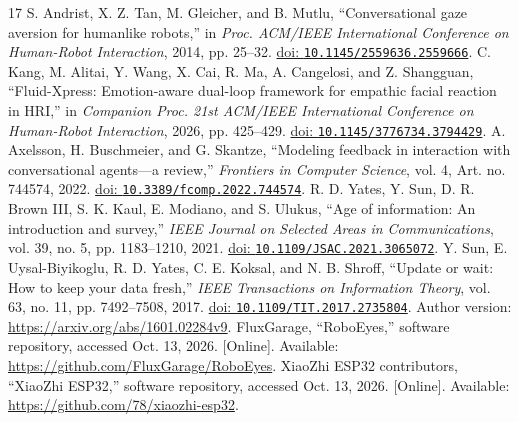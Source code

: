 \documentclass[journal]{IEEEtran}
\newcommand{\doi}[1]{\href{https://doi.org/#1}{doi: \nolinkurl{#1}}}
\begin{document}
\begin{thebibliography}{17}
 S. Andrist, X. Z. Tan, M. Gleicher, and B. Mutlu, ``Conversational gaze aversion for humanlike robots,'' in \emph{Proc. ACM/IEEE International Conference on Human-Robot Interaction}, 2014, pp. 25--32. \doi{10.1145/2559636.2559666}.
 C. Kang, M. Alitai, Y. Wang, X. Cai, R. Ma, A. Cangelosi, and Z. Shangguan, ``Fluid-Xpress: Emotion-aware dual-loop framework for empathic facial reaction in HRI,'' in \emph{Companion Proc. 21st ACM/IEEE International Conference on Human-Robot Interaction}, 2026, pp. 425--429. \doi{10.1145/3776734.3794429}.
 A. Axelsson, H. Buschmeier, and G. Skantze, ``Modeling feedback in interaction with conversational agents---a review,'' \emph{Frontiers in Computer Science}, vol. 4, Art. no. 744574, 2022. \doi{10.3389/fcomp.2022.744574}.
 R. D. Yates, Y. Sun, D. R. Brown III, S. K. Kaul, E. Modiano, and S. Ulukus, ``Age of information: An introduction and survey,'' \emph{IEEE Journal on Selected Areas in Communications}, vol. 39, no. 5, pp. 1183--1210, 2021. \doi{10.1109/JSAC.2021.3065072}.
 Y. Sun, E. Uysal-Biyikoglu, R. D. Yates, C. E. Koksal, and N. B. Shroff, ``Update or wait: How to keep your data fresh,'' \emph{IEEE Transactions on Information Theory}, vol. 63, no. 11, pp. 7492--7508, 2017. \doi{10.1109/TIT.2017.2735804}. Author version: \url{https://arxiv.org/abs/1601.02284v9}.
 FluxGarage, ``RoboEyes,'' software repository, accessed Oct. 13, 2026. [Online]. Available: \url{https://github.com/FluxGarage/RoboEyes}.
 XiaoZhi ESP32 contributors, ``XiaoZhi ESP32,'' software repository, accessed Oct. 13, 2026. [Online]. Available: \url{https://github.com/78/xiaozhi-esp32}.
\end{thebibliography}
\end{document}
